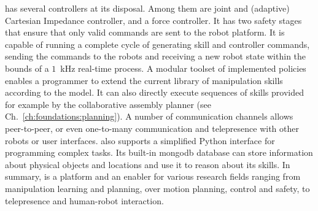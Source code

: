 \softwareabbr{} has several controllers at its disposal.
Among them are joint and (adaptive) Cartesian Impedance controller, and a force controller.
It has two safety stages that ensure that only valid commands are sent to the robot platform.
It is capable of running a complete cycle of generating skill and controller commands, sending the commands to the robots and receiving a new robot state within the bounds of a $1$~kHz real-time process.
A modular toolset of implemented policies enables a programmer to extend the current library of manipulation skills according to the \skillmodelabbr{} model.
It can also directly execute sequences of skills provided for example by the collaborative assembly planner (see Ch.~\ref{ch:foundations:planning}).
A number of communication channels allows peer-to-peer, or even one-to-many communication and telepresence with other robots or user interfaces.
\softwareabbr{} also supports a simplified Python interface for programming complex tasks.
Its built-in mongodb database can store information about physical objects and locations and use it to reason about its skills.
In summary, \softwareabbr{} is a platform and an enabler for various research fields ranging from manipulation learning and planning, over motion planning, control and safety, to telepresence and human-robot interaction.